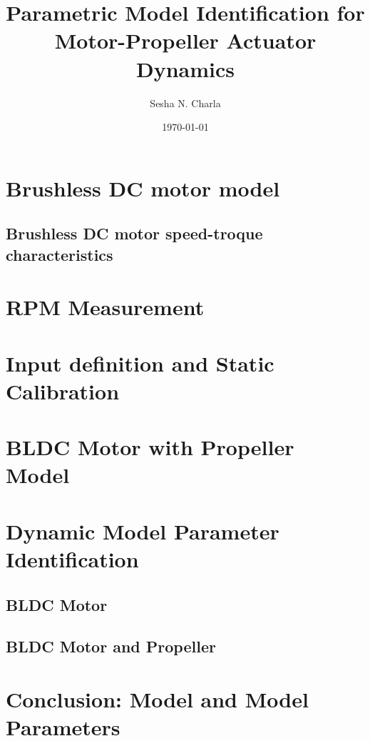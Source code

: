 \documentclass[letterpaper, 11pt]{article}
\title{Parametric Model Identification for Motor-Propeller Actuator Dynamics}
\author{Sesha N. Charla}
\date{\today}
\begin{document}
\maketitle
\tableofcontents
\newpage
\newpage
\newpage
\section{Brushless DC motor model}
\subsection{Brushless DC motor speed-troque characteristics \cite{crowder2019electric}}



\newpage
\section{RPM Measurement}

\newpage
\section{Input definition and Static Calibration}


\newpage
\section{BLDC Motor with Propeller Model}

\newpage
\section{Dynamic Model Parameter Identification}
\subsection{BLDC Motor}
\subsection{BLDC Motor and Propeller}
\newpage
\section{Conclusion: Model and Model Parameters}
\end{document}
